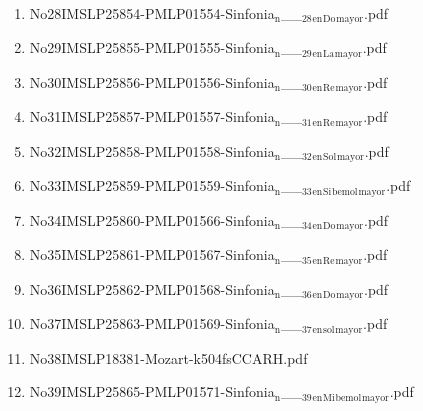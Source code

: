 \documentclass[11pt]{article}
\begin{document}
\begin{enumerate}
\begin{enumerate}
\item No28IMSLP25854-PMLP01554-Sinfonia$_{\text{n}}$\_\_$_{\text{28}}$$_{\text{en}}$$_{\text{Do}}$$_{\text{mayor}}$.pdf
\label{sec-1-1-1-1-44-49-11-69}

\item No29IMSLP25855-PMLP01555-Sinfonia$_{\text{n}}$\_\_$_{\text{29}}$$_{\text{en}}$$_{\text{La}}$$_{\text{mayor}}$.pdf
\label{sec-1-1-1-1-44-49-11-70}

\item No30IMSLP25856-PMLP01556-Sinfonia$_{\text{n}}$\_\_$_{\text{30}}$$_{\text{en}}$$_{\text{Re}}$$_{\text{mayor}}$.pdf
\label{sec-1-1-1-1-44-49-11-71}

\item No31IMSLP25857-PMLP01557-Sinfonia$_{\text{n}}$\_\_$_{\text{31}}$$_{\text{en}}$$_{\text{Re}}$$_{\text{mayor}}$.pdf
\label{sec-1-1-1-1-44-49-11-72}

\item No32IMSLP25858-PMLP01558-Sinfonia$_{\text{n}}$\_\_$_{\text{32}}$$_{\text{en}}$$_{\text{Sol}}$$_{\text{mayor}}$.pdf
\label{sec-1-1-1-1-44-49-11-73}

\item No33IMSLP25859-PMLP01559-Sinfonia$_{\text{n}}$\_\_$_{\text{33}}$$_{\text{en}}$$_{\text{Si}}$$_{\text{bemol}}$$_{\text{mayor}}$.pdf
\label{sec-1-1-1-1-44-49-11-74}

\item No34IMSLP25860-PMLP01566-Sinfonia$_{\text{n}}$\_\_$_{\text{34}}$$_{\text{en}}$$_{\text{Do}}$$_{\text{mayor}}$.pdf
\label{sec-1-1-1-1-44-49-11-75}

\item No35IMSLP25861-PMLP01567-Sinfonia$_{\text{n}}$\_\_$_{\text{35}}$$_{\text{en}}$$_{\text{Re}}$$_{\text{mayor}}$.pdf
\label{sec-1-1-1-1-44-49-11-76}

\item No36IMSLP25862-PMLP01568-Sinfonia$_{\text{n}}$\_\_$_{\text{36}}$$_{\text{en}}$$_{\text{Do}}$$_{\text{mayor}}$.pdf
\label{sec-1-1-1-1-44-49-11-77}

\item No37IMSLP25863-PMLP01569-Sinfonia$_{\text{n}}$\_\_$_{\text{37}}$$_{\text{en}}$$_{\text{sol}}$$_{\text{mayor}}$.pdf
\label{sec-1-1-1-1-44-49-11-78}

\item No38IMSLP18381-Mozart-k504fsCCARH.pdf
\label{sec-1-1-1-1-44-49-11-79}

\item No39IMSLP25865-PMLP01571-Sinfonia$_{\text{n}}$\_\_$_{\text{39}}$$_{\text{en}}$$_{\text{Mi}}$$_{\text{bemol}}$$_{\text{mayor}}$.pdf
\label{sec-1-1-1-1-44-49-11-80}


\end{enumerate}
\end{enumerate}
\end{document}
